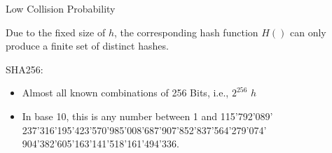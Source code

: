 \documentclass[handout]{beamer}
\begin{document}
\begin{frame}{Low Collision Probability}

Due to the fixed size of $h$, the corresponding hash function $H()$ can only produce a finite set of distinct hashes.
\vspace{1em}

SHA256:
	\begin{itemize}
		\item Almost all known combinations of 256 Bits, i.e.,  $2^{256}$ $h$
		\item In base 10, this is any number between 1 and 115'792'089' 237'316'195'423'570'985'008'687'907’852'837'564'279'074' 904'382'605'163'141'518'161'494'336.
	\end{itemize}
\vspace{1em}


	
\end{frame}

\end{document}

